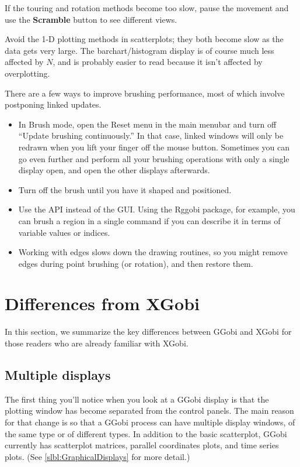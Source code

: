 \documentclass[11pt]{article}
\begin{document}
If the touring and rotation methods become too slow, pause the movement
and use the {\bf Scramble} button to see different views.

Avoid the 1-D plotting methods in scatterplots; they both become slow
as the data gets very large.  The barchart/histogram display is of course
much less affected by $N$, and is probably easier to read because it
isn't affected by overplotting.

There are a few ways to improve brushing performance, most of which
involve postponing linked updates.  
\begin{itemize}
\item In Brush mode, open the Reset menu in the main menubar and turn off
 ``Update brushing continuously.''  In that case, linked windows will only
 be redrawn when you lift your finger off the mouse button.  Sometimes you
 can go even further and perform all your brushing operations with only
 a single display open, and open the other displays afterwards.
\item Turn off the brush until you have it shaped and positioned.
\item Use the API instead of the GUI.  Using the Rggobi package, for
 example, you can brush a region in a single command if you can describe
 it in terms of variable values or indices.
\item Working with edges slows down the drawing routines, so you might
 remove edges during point brushing (or rotation), and then restore them.
\end{itemize}

\newpage
\section{Differences from XGobi}
\label{slbl:xgobi}

In this section, we summarize the key differences between GGobi
and XGobi for those readers who are already familiar with XGobi.

\subsection {Multiple displays}

The first thing you'll notice when you look at a GGobi display is
that the plotting window has become separated from the control
panels.  The main reason for that change is so that a GGobi process
can have multiple display windows, of the same type or of different
types.  In addition to the basic scatterplot, GGobi currently has
scatterplot matrices, parallel coordinates plots, and time series
plots.  (See \ref{slbl:GraphicalDisplays} for more detail.)
\end{document}
